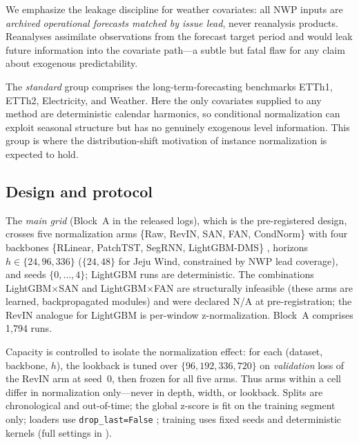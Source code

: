 We emphasize the leakage discipline for weather covariates: all NWP inputs are \emph{archived operational forecasts matched by issue lead}, never reanalysis products. Reanalyses assimilate observations from the forecast target period and would leak future information into the covariate path---a subtle but fatal flaw for any claim about exogenous predictability.

The \emph{standard} group comprises the long-term-forecasting benchmarks ETTh1, ETTh2, Electricity, and Weather. Here the only covariates supplied to any method are deterministic calendar harmonics, so conditional normalization can exploit seasonal structure but has no genuinely exogenous level information. This group is where the distribution-shift motivation of instance normalization \citep{kim2022revin} is expected to hold.

\subsection{Design and protocol}

The \emph{main grid} (Block~A in the released logs), which is the pre-registered design, crosses five normalization arms \{Raw, RevIN, SAN, FAN, CondNorm\} \citep{kim2022revin,liu2023san,ye2024fan} with four backbones \{RLinear, PatchTST, SegRNN, LightGBM-DMS\} \citep{li2023rlinear,nie2023patchtst,lin2023segrnn,ke2017lightgbm}, horizons $h\in\{24,96,336\}$ ($\{24,48\}$ for Jeju Wind, constrained by NWP lead coverage), and seeds $\{0,\dots,4\}$; LightGBM runs are deterministic. The combinations LightGBM$\times$SAN and LightGBM$\times$FAN are structurally infeasible (these arms are learned, backpropagated modules) and were declared N/A at pre-registration; the RevIN analogue for LightGBM is per-window z-normalization. Block~A comprises 1{,}794 runs.

Capacity is controlled to isolate the normalization effect: for each (dataset, backbone, $h$), the lookback is tuned over $\{96,192,336,720\}$ on \emph{validation} loss of the RevIN arm at seed~0, then frozen for all five arms. Thus arms within a cell differ in normalization only---never in depth, width, or lookback. Splits are chronological and out-of-time; the global z-score is fit on the training segment only; loaders use \texttt{drop\_last=False} \citep{qiu2024tfb}; training uses fixed seeds and deterministic kernels (full settings in ).

